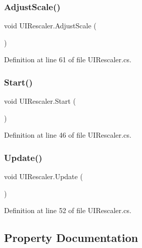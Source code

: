 \subsubsection{\texorpdfstring{Adjust\+Scale()}{AdjustScale()}}
{\footnotesize\ttfamily void U\+I\+Rescaler.\+Adjust\+Scale (\begin{DoxyParamCaption}{ }\end{DoxyParamCaption})}



Definition at line 61 of file U\+I\+Rescaler.\+cs.

\mbox{\label{class_u_i_rescaler_a57cf9e52eff852bdf1494a62c196205c}} 
\subsubsection{\texorpdfstring{Start()}{Start()}}
{\footnotesize\ttfamily void U\+I\+Rescaler.\+Start (\begin{DoxyParamCaption}{ }\end{DoxyParamCaption})}



Definition at line 46 of file U\+I\+Rescaler.\+cs.

\mbox{\label{class_u_i_rescaler_a45ffe32f3e0a597b2ed3331578d9a921}} 
\subsubsection{\texorpdfstring{Update()}{Update()}}
{\footnotesize\ttfamily void U\+I\+Rescaler.\+Update (\begin{DoxyParamCaption}{ }\end{DoxyParamCaption})}



Definition at line 52 of file U\+I\+Rescaler.\+cs.



\subsection{Property Documentation}
\mbox{\label{class_u_i_rescaler_a7b328eb24eeae49bd82c1c332dd536d8}} 
